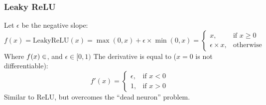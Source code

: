 \documentclass[aspectratio=169, 10pt]{beamer}
\begin{document}
\begin{frame}
    \frametitle{Leaky ReLU}
    \small
    \begin{figure}
        \centering
    \end{figure}
    Let $\epsilon$ be the negative slope:
    \[
        f(x) = \text{LeakyReLU}(x) = \max(0, x) + \epsilon \times \min(0, x) = \begin{cases}
            x,& \text{if } x \geq 0\\
            \epsilon \times x,& \text{otherwise}
        \end{cases}
    \]
    Where $f(x) \in \rm$, and $\epsilon \in [0, 1)$ The derivative is equal to ($x = 0$ is not differentiable):
    \[
        f'(x) = \begin{cases}
            \epsilon,& \text{if } x < 0 \\
            1,& \text{if } x > 0
        \end{cases}
    \]
    Similar to ReLU, but overcomes the ``dead neuron'' problem.
\end{frame}

\end{document}
